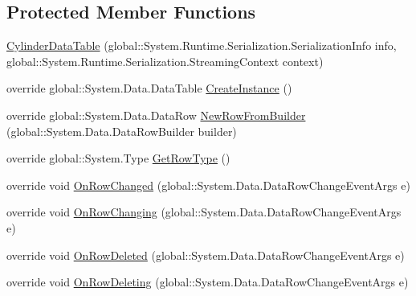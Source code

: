 \subsection*{Protected Member Functions}
\begin{DoxyCompactItemize}
\item 
\hyperlink{class_env_int_1_1_win32_1_1_field_tech_1_1_manager_1_1_data_sets_1_1_guide_ware_mobile_data_set_1_1_cylinder_data_table_a258e3b51eaf18fbeddcc4d575676d69b}{Cylinder\+Data\+Table} (global\+::\+System.\+Runtime.\+Serialization.\+Serialization\+Info info, global\+::\+System.\+Runtime.\+Serialization.\+Streaming\+Context context)
\item 
override global\+::\+System.\+Data.\+Data\+Table \hyperlink{class_env_int_1_1_win32_1_1_field_tech_1_1_manager_1_1_data_sets_1_1_guide_ware_mobile_data_set_1_1_cylinder_data_table_a16eb2d36bd7516bc5af885189880a72b}{Create\+Instance} ()
\item 
override global\+::\+System.\+Data.\+Data\+Row \hyperlink{class_env_int_1_1_win32_1_1_field_tech_1_1_manager_1_1_data_sets_1_1_guide_ware_mobile_data_set_1_1_cylinder_data_table_a38286642d38d801bc251b7975c6f6d84}{New\+Row\+From\+Builder} (global\+::\+System.\+Data.\+Data\+Row\+Builder builder)
\item 
override global\+::\+System.\+Type \hyperlink{class_env_int_1_1_win32_1_1_field_tech_1_1_manager_1_1_data_sets_1_1_guide_ware_mobile_data_set_1_1_cylinder_data_table_acc365930b6087f2209b79e86611b3efe}{Get\+Row\+Type} ()
\item 
override void \hyperlink{class_env_int_1_1_win32_1_1_field_tech_1_1_manager_1_1_data_sets_1_1_guide_ware_mobile_data_set_1_1_cylinder_data_table_a01ac482823827536c078abe89876b20c}{On\+Row\+Changed} (global\+::\+System.\+Data.\+Data\+Row\+Change\+Event\+Args e)
\item 
override void \hyperlink{class_env_int_1_1_win32_1_1_field_tech_1_1_manager_1_1_data_sets_1_1_guide_ware_mobile_data_set_1_1_cylinder_data_table_a8c6b982bdfca7c8bfb0e325ce3c96ce6}{On\+Row\+Changing} (global\+::\+System.\+Data.\+Data\+Row\+Change\+Event\+Args e)
\item 
override void \hyperlink{class_env_int_1_1_win32_1_1_field_tech_1_1_manager_1_1_data_sets_1_1_guide_ware_mobile_data_set_1_1_cylinder_data_table_a2baad04e898e7aa406c5731bdddc9c85}{On\+Row\+Deleted} (global\+::\+System.\+Data.\+Data\+Row\+Change\+Event\+Args e)
\item 
override void \hyperlink{class_env_int_1_1_win32_1_1_field_tech_1_1_manager_1_1_data_sets_1_1_guide_ware_mobile_data_set_1_1_cylinder_data_table_a1a127a8fa6bae0950429d9ec3b7624ae}{On\+Row\+Deleting} (global\+::\+System.\+Data.\+Data\+Row\+Change\+Event\+Args e)

\end{DoxyCompactItemize}
